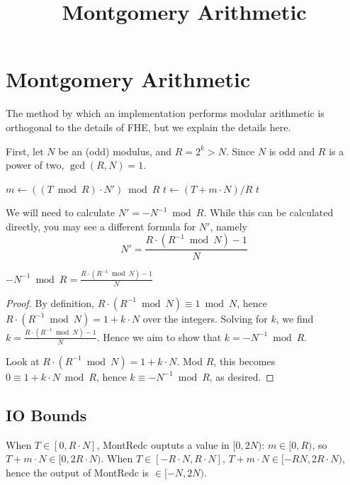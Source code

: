 \documentclass[../fheimpl.tex]{subfiles}
\begin{document}
\ifcompileasbook
\else
\title{Montgomery Arithmetic}
\hypersetup{pageanchor=false}
\maketitle
\listoffixmes
\tableofcontents
\compileasbooktrue
\hypersetup{pageanchor=true}
\fi

\section{Montgomery Arithmetic}
The method by which an implementation performs modular arithmetic is orthogonal to the details of FHE, but we explain the details here.

First, let $N$ be an (odd) modulus, and $R=2^k>N$. Since $N$ is odd and $R$ is a power of two, $\gcd(R,N)=1$.

\begin{algorithm}
    \caption{Montgomery Reduction}\label{alg:mont_redc_simple}
    \begin{algorithmic}[1]
            \State $m\gets ((T\bmod R)\cdot N')\bmod R$
            \State $t\gets (T+m\cdot N)/R$
            \State \Return $t$
        \EndProcedure
    \end{algorithmic}
\end{algorithm}

We will need to calculate $N'=-N^{-1} \bmod R$. While this can be calculated directly, you may see a different formula for $N'$, namely
\[N' = \frac{R\cdot (R^{-1}\bmod N) - 1}{N}\]

\begin{lemma}
	$-N^{-1} \bmod R = \frac{R\cdot (R^{-1}\bmod N) - 1}{N}$
\end{lemma}
\begin{proof}
	By definition, $R\cdot (R^{-1}\bmod N) \equiv 1\bmod N$, hence $R\cdot (R^{-1}\bmod N) = 1 + k\cdot N$ over the integers. Solving for $k$, we find $k=\frac{R\cdot (R^{-1}\bmod N) - 1}{N}$. Hence we aim to show that $k=-N^{-1} \bmod R$. 
	
	Look at $R\cdot (R^{-1}\bmod N) = 1 + k\cdot N$. Mod $R$, this becomes $0\equiv 1+k\cdot N\bmod R$, hence $k\equiv -N^{-1}\bmod R$, as desired.
\end{proof}

\subsection{IO Bounds}
When $T\in[0, R\cdot N]$, \textsf{MontRedc} ouptuts a value in $[0, 2N)$: $m\in[0, R)$, so $T+m\cdot N\in [0, 2R\cdot N)$.
When $T\in[-R\cdot N, R\cdot N]$, $T+m\cdot N\in [-RN, 2R\cdot N)$, hence the output of \textsf{MontRedc} is $\in [-N, 2N)$.
\end{document}
